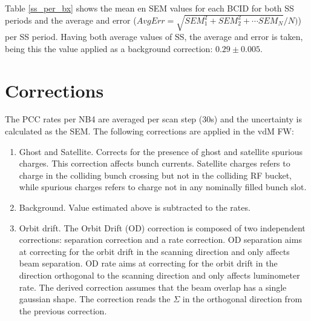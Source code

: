 Table \ref{ss_per_bx} shows the mean en SEM values for each BCID for both SS periods and the average and error ($AvgErr= \sqrt{SEM_1^2+SEM_2^2+\cdots SEM_{N}}/N) $) per SS period. Having both average values of SS, the average and error is taken, being this the value applied as a background correction:  $ 0.29 \pm 0.005$.

\section{Corrections}
The PCC rates per NB4 are averaged per scan step (30s) and the uncertainty is calculated as the SEM. The following corrections are applied in the vdM FW:

\begin{enumerate}
\item Ghost and Satellite. Corrects for the presence of ghost and satellite spurious charges. This correction affects bunch currents. Satellite charges refers to charge in the colliding bunch crossing but not in the colliding RF bucket, while spurious charges refers to charge not in any nominally filled bunch slot.%
\item Background. Value estimated above is subtracted to the rates.%
\item Orbit drift. The Orbit Drift (OD) correction is composed of two independent corrections: separation correction and a rate correction. OD separation aims at correcting for the orbit drift in the scanning direction and only affects beam separation.  OD rate aims at correcting for the orbit drift in the direction orthogonal to the scanning direction and only affects luminometer rate. The derived correction assumes that the beam overlap has a single gaussian shape. The correction reads the $\Sigma$ in the orthogonal direction from the previous correction.


\end{enumerate}

